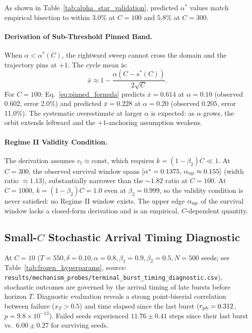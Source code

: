 As shown in Table~\ref{tab:alpha_star_validation}, predicted $\alpha^*$ values match empirical bisection to within $3.0\%$ at $C=100$ and $5.8\%$ at $C=300$.

\paragraph{Derivation of Sub-Threshold Pinned Band.}
When $\alpha < \alpha^*(C)$, the rightward sweep cannot cross the domain and the trajectory pins at $+1$. The cycle mean is:
\begin{equation}
    \bar{x} \approx 1 - \frac{\alpha(C-s^*(C))}{2\sqrt{C}}.
    \label{eq:pinned_formula}
\end{equation}
For $C=100$: Eq.~\eqref{eq:pinned_formula} predicts $\bar{x} = 0.614$ at $\alpha=0.10$ (observed $0.602$, error 2.0\%) and predicted $\bar{x} = 0.228$ at $\alpha=0.20$ (observed $0.205$, error 11.0\%). The systematic overestimate at larger $\alpha$ is expected: as $\alpha$ grows, the orbit extends leftward and the $+1$-anchoring assumption weakens.

\paragraph{Regime II Validity Condition.}
The derivation assumes $v_t \approx \text{const}$, which requires $k=(1-\beta_2)C \ll 1$. At $C=300$, the observed survival window spans $[\alpha^*=0.1375,\, \alpha_{\rm up}\approx 0.155]$ (width ratio $\approx 1.13$), substantially narrower than the $\sim1.82$ ratio at $C=100$. At $C=1000$, $k = (1-\beta_2)C = 1.0$ even at $\beta_2=0.999$, so the validity condition is never satisfied: no Regime II window exists. The upper edge $\alpha_{\rm up}$ of the survival window lacks a closed-form derivation and is an empirical, $C$-dependent quantity.

\subsection{Small-$C$ Stochastic Arrival Timing Diagnostic}
At $C=10$ ($T=550, \delta=0.10, \alpha=0.8, \beta_1=0.9, \beta_2=0.5, N=500$ seeds; see Table~\ref{tab:frozen_hyperparams}, source: \nolinkurl{results/mechanism_probes/terminal_burst_timing_diagnostic.csv}), stochastic outcomes are governed by the arrival timing of late bursts before horizon $T$. Diagnostic evaluation reveals a strong point-biserial correlation between failure ($x_T > 0.5$) and time elapsed since the last burst ($r_{\rm pb}=0.312$, $p=9.8\times10^{-13}$). Failed seeds experienced $11.76 \pm 0.41$ steps since their last burst vs.\ $6.00 \pm 0.27$ for surviving seeds.
